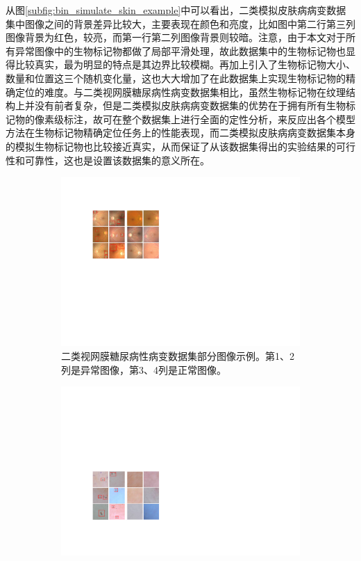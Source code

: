 从图\ref{subfig:bin_simulate_skin_example}中可以看出，二类模拟皮肤病病变数据集中图像之间的背景差异比较大，主要表现在颜色和亮度，比如图中第二行第三列图像背景为红色，较亮，而第一行第二列图像背景则较暗。注意，由于本文对于所有异常图像中的生物标记物都做了局部平滑处理，故此数据集中的生物标记物也显得比较真实，最为明显的特点是其边界比较模糊。再加上引入了生物标记物大小、数量和位置这三个随机变化量，这也大大增加了在此数据集上实现生物标记物的精确定位的难度。与二类视网膜糖尿病性病变数据集相比，虽然生物标记物在纹理结构上并没有前者复杂，但是二类模拟皮肤病病变数据集的优势在于拥有所有生物标记物的像素级标注，故可在整个数据集上进行全面的定性分析，来反应出各个模型方法在生物标记物精确定位任务上的性能表现，而二类模拟皮肤病病变数据集本身的模拟生物标记物也比较接近真实，从而保证了从该数据集得出的实验结果的可行性和可靠性，这也是设置该数据集的意义所在。
\begin{figure}[h!]
	\centering
	\begin{subfigure}{0.48\textwidth}
		\centering
		\includegraphics[width=1\textwidth]{figure/bin_dr_ds_example}
		\caption{二类视网膜糖尿病性病变数据集部分图像示例。第1、2列是异常图像，第3、4列是正常图像。}
		\label{subfig:bin_dr_ds_example}
	\end{subfigure}
	\quad
	\begin{subfigure}{0.48\textwidth}
		\centering
		\includegraphics[width=1\textwidth]{figure/bin_simulate_skin_example}

\end{subfigure}
\end{figure}
